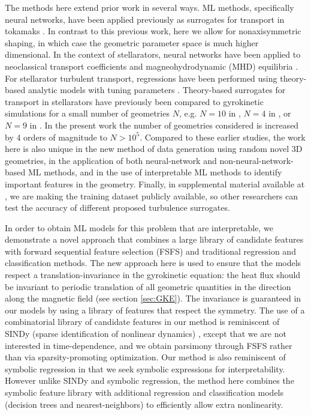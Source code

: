 \documentclass{jpp}
\begin{document}
The methods here extend prior work in several ways.
ML methods, specifically neural networks, have been applied previously as surrogates for transport in tokamaks \citep{meneghini2014modeling, citrin2015real, meneghini2017self, narita2019neural, honda2019machine, van2020fast, boyer2021prediction, abbate2021data, li2024surrogate}. 
In contrast to this previous work, here we allow for nonaxisymmetric shaping, in which case the geometric parameter space is much higher dimensional.
In the context of stellarators, neural networks have been applied to neoclassical transport coefficients \citep{wakasa2007construction} and magneohydrodynamic (MHD) equilibria \citep{merlo2021proof, curvo2024using}.
For stellarator turbulent transport, regressions have been performed using theory-based analytic models with tuning parameters \citep{nakayama2023simplified}.
Theory-based surrogates for transport in stellarators have previously been compared to gyrokinetic simulations for a small number of geometries $N$, e.g. $N=10$ in \cite{proll2015tem}, $N=4$ in \cite{mackenbach2022available}, or $N=9$ in \cite{roberg2023critical}.
In the present work the number of geometries considered is increased by 4 orders of magnitude to  $N> 10^5$.
Compared to these earlier studies, the work here is also unique in the new method of data generation using random novel 3D geometries, in the application of both neural-network and non-neural-network-based ML methods, and in the use of interpretable ML methods to identify important features in the geometry.
Finally, in supplemental material available at \citep{zenodo}, we are making the training dataset publicly available, so other researchers can test the accuracy of different proposed turbulence surrogates.

In order to obtain ML models for this problem that are interpretable, we demonstrate a novel approach that combines a large library of candidate features with forward sequential feature selection (FSFS) and traditional regression and classification methods.
The new approach here is used to ensure that the models respect a translation-invariance in the gyrokinetic equation: the heat flux should be invariant to periodic translation of all geometric quantities in the direction along the magnetic field (see section \ref{sec:GKE}).
The invariance is guaranteed in our models by using a library of features that respect the symmetry.
The use of a combinatorial library of candidate features in our method is reminiscent of SINDy (sparse identification of nonlinear dynamics) \citep{brunton2016discovering}, except that we are not interested in time-dependence, and we obtain parsimony through FSFS rather than via sparsity-promoting optimization.
Our method is also reminiscent of symbolic regression \citep{koza1994genetic} in that we seek symbolic expressions for interpretability.
However unlike SINDy and symbolic regression, the method here combines the symbolic feature library with additional regression and classification models (decision trees and nearest-neighbors) to efficiently allow extra nonlinearity.
\end{document}
